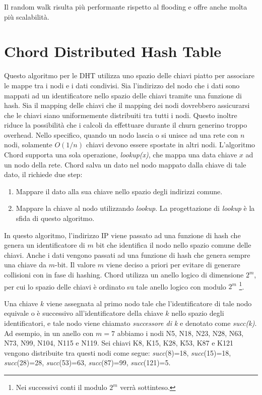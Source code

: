 Il random walk risulta più performante rispetto al flooding e offre anche molta più scalabilità.


\section{Chord Distributed Hash Table}\label{chord-distributed-hash-table}

Questo algoritmo per le DHT utilizza uno spazio delle chiavi piatto per associare le mappe tra i nodi e i dati condivisi. Sia l'indirizzo del nodo che i dati sono mappati ad un identificatore nello spazio delle chiavi tramite una funzione di hash. Sia il mapping delle chiavi che il mapping dei nodi dovrebbero assicurarsi che le chiavi siano uniformemente distribuiti tra tutti i nodi. Questo inoltre riduce la possibilità che i calcoli da effettuare durante il \gls{churn} generino troppo overhead. Nello specifico, quando un nodo lascia o si unisce ad una rete con $n$ nodi, solamente $O(1/n)$ chiavi devono essere spostate in altri nodi. L'algoritmo Chord supporta una sola operazione, \emph{lookup(x)}, che mappa una data chiave $x$ ad un nodo della rete. Chord salva un dato nel nodo mappato dalla chiave di tale dato, il richiede due step:

\begin{enumerate}
\def\labelenumi{\arabic{enumi}.}
\itemsep1pt\parskip0pt
\item
  Mappare il dato alla sua chiave nello spazio degli indirizzi comune.
\item
  Mappare la chiave al nodo utilizzando \emph{lookup}. La progettazione   di \emph{lookup} è la sfida di questo algoritmo.
\end{enumerate}

In questo algoritmo, l'indirizzo IP viene passato ad una funzione di hash che genera un identificatore di $m$ bit che identifica il nodo nello spazio comune delle chiavi. Anche i dati vengono passati ad una funzione di hash che genera sempre una chiave da $m$-bit. Il valore $m$ viene deciso a priori per evitare di generare collisioni con in fase di hashing. Chord utilizza un anello logico di dimensione $2^m$, per cui lo spazio delle chiavi è ordinato su tale anello logico con modulo $2^m$ \footnote{Nei successivi conti il modulo $2^m$ verrà sottinteso.}.

Una chiave $k$ viene assegnata al primo nodo tale che l'identificatore di tale nodo equivale o è successivo all'identificatore della chiave $k$ nello spazio degli identificatori, e tale nodo viene chiamato \emph{successore di k} e denotato come \emph{succ(k)}. Ad esempio, in un anello con $m=7$ abbiamo i nodi N5, N18, N23, N28, N63, N73, N99, N104, N115 e N119. Sei chiavi K8, K15, K28, K53, K87 e K121 vengono distribuite tra questi nodi come segue: \emph{succ}(8)=18, \emph{succ}(15)=18, \emph{succ}(28)=28, \emph{succ}(53)=63, \emph{succ}(87)=99, \emph{succ}(121)=5.

